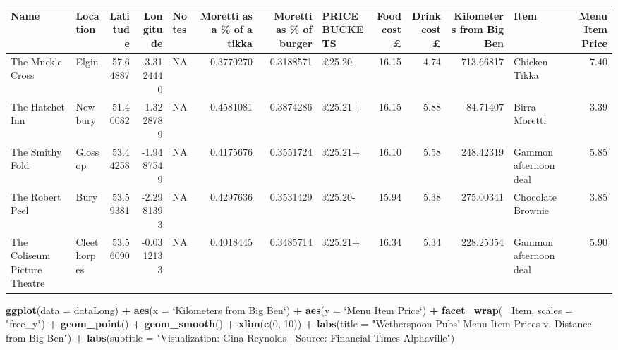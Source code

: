 \documentclass[]{book}
\newenvironment{Shaded}{\begin{snugshade}}{\end{snugshade}}
\newcommand{\KeywordTok}[1]{\textcolor[rgb]{0.13,0.29,0.53}{\textbf{#1}}}
\newcommand{\DataTypeTok}[1]{\textcolor[rgb]{0.13,0.29,0.53}{#1}}
\newcommand{\DecValTok}[1]{\textcolor[rgb]{0.00,0.00,0.81}{#1}}
\newcommand{\StringTok}[1]{\textcolor[rgb]{0.31,0.60,0.02}{#1}}
\newcommand{\OperatorTok}[1]{\textcolor[rgb]{0.81,0.36,0.00}{\textbf{#1}}}
\newcommand{\NormalTok}[1]{#1}
\theoremstyle{definition}
\theoremstyle{definition}
\theoremstyle{definition}
\theoremstyle{remark}
\begin{document}
\begin{tabular}{l|l|r|r|l|r|r|l|r|r|r|l|r}
\hline
Name & Location & Latitude & Longitude & Notes & Moretti as a \% of a tikka & Moretti as \% of burger & PRICE BUCKETS & Food cost £ & Drink cost £ & Kilometers from Big Ben & Item & Menu Item Price\\
\hline
The Muckle Cross & Elgin & 57.64887 & -3.3124440 & NA & 0.3770270 & 0.3188571 & £25.20- & 16.15 & 4.74 & 713.66817 & Chicken Tikka & 7.40\\
\hline
The Hatchet Inn & Newbury & 51.40082 & -1.3228789 & NA & 0.4581081 & 0.3874286 & £25.21+ & 16.15 & 5.88 & 84.71407 & Birra Moretti & 3.39\\
\hline
The Smithy Fold & Glossop & 53.44258 & -1.9487549 & NA & 0.4175676 & 0.3551724 & £25.21+ & 16.10 & 5.58 & 248.42319 & Gammon afternoon deal & 5.85\\
\hline
The Robert Peel & Bury & 53.59381 & -2.2981393 & NA & 0.4297636 & 0.3531429 & £25.20- & 15.94 & 5.38 & 275.00341 & Chocolate Brownie & 3.85\\
\hline
The Coliseum Picture Theatre & Cleethorpes & 53.56090 & -0.0312133 & NA & 0.4018445 & 0.3485714 & £25.21+ & 16.34 & 5.34 & 228.25354 & Gammon afternoon deal & 5.90\\
\hline
\end{tabular}

\begin{Shaded}
\begin{Highlighting}[]
\KeywordTok{ggplot}\NormalTok{(}\DataTypeTok{data =}\NormalTok{ dataLong) }\OperatorTok{+}
\StringTok{  }\KeywordTok{aes}\NormalTok{(}\DataTypeTok{x =} \StringTok{`}\DataTypeTok{Kilometers from Big Ben}\StringTok{`}\NormalTok{) }\OperatorTok{+}
\StringTok{  }\KeywordTok{aes}\NormalTok{(}\DataTypeTok{y =} \StringTok{`}\DataTypeTok{Menu Item Price}\StringTok{`}\NormalTok{) }\OperatorTok{+}
\StringTok{  }\KeywordTok{facet_wrap}\NormalTok{(}\OperatorTok{~}\StringTok{ }\NormalTok{Item, }\DataTypeTok{scales =} \StringTok{"free_y"}\NormalTok{) }\OperatorTok{+}
\StringTok{  }\KeywordTok{geom_point}\NormalTok{() }\OperatorTok{+}
\StringTok{  }\KeywordTok{geom_smooth}\NormalTok{() }\OperatorTok{+}
\StringTok{  }\KeywordTok{xlim}\NormalTok{(}\KeywordTok{c}\NormalTok{(}\DecValTok{0}\NormalTok{, }\DecValTok{10}\NormalTok{)) }\OperatorTok{+}
\StringTok{  }\KeywordTok{labs}\NormalTok{(}\DataTypeTok{title =} \StringTok{"Wetherspoon Pubs' Menu Item Prices v. Distance from Big Ben"}\NormalTok{) }\OperatorTok{+}
\StringTok{  }\KeywordTok{labs}\NormalTok{(}\DataTypeTok{subtitle =} \StringTok{"Visualization: Gina Reynolds | Source: Financial Times Alphaville"}\NormalTok{) }
\end{Highlighting}
\end{Shaded}
\end{document}
